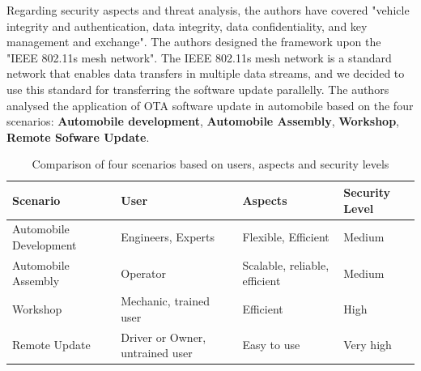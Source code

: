 \documentclass[12pt,a4paper]{article}
\begin{document}
Regarding security aspects and threat analysis, the authors have covered "vehicle integrity and authentication, data integrity, data confidentiality, and key management and exchange". The authors designed the framework upon the "IEEE 802.11s mesh network". The IEEE 802.11s mesh network is a standard network that enables data transfers in multiple data streams, and we decided to use this standard for transferring the software update parallelly. The authors analysed the application of OTA software update in automobile based on the four scenarios: \textbf{Automobile development}, \textbf{Automobile Assembly}, \textbf{Workshop}, \textbf{Remote Sofware Update}. \cite{r3}\\


\begin{table}
\centering
\begin{tabular}{ |p{3.5cm}||p{3.5cm}|p{3.5cm}|p{3.5cm}|  }
 \hline
 Scenario& User & Aspects & Security Level\\
 \hline
 Automobile Development   & Engineers, Experts & Flexible, Efficient  &  Medium\\
 \hline
 Automobile Assembly& Operator  & Scalable, reliable, efficient & Medium\\
 \hline
 Workshop & Mechanic, trained user & Efficient &  High\\
 \hline
 Remote Update& Driver or Owner, untrained user & Easy to use&  Very high\\
 \hline
\end{tabular}
\caption{Comparison of four scenarios based on users, aspects and security levels \cite{r3}}
\label{comparison_scenarios}
\end{table}
\end{document}
